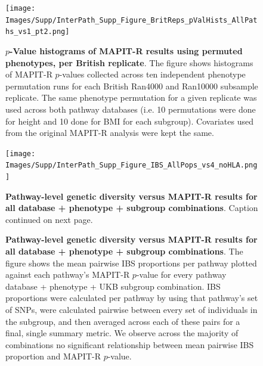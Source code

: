 \documentclass[12pt,a4paper]{article}
\begin{document}
\setlength{\footskip}{2cm}
\begin{figure}[htbp]
\centering
\vspace*{-1cm}
\texttt{[image: Images/Supp/InterPath\_Supp\_Figure\_BritReps\_pValHists\_AllPaths\_vs1\_pt2.png]}
\caption[TBD]{\textbf{$p$-Value histograms of MAPIT-R results using permuted phenotypes, per British replicate}. The figure shows histograms of MAPIT-R $p$-values collected across ten independent phenotype permutation runs for each British Ran4000 and Ran10000 subsample replicate. The same phenotype permutation for a given replicate was used across both pathway databases (i.e. 10 permutations were done for height and 10 done for BMI for each subgroup). Covariates used from the original MAPIT-R analysis were kept the same.}
\label{InterPath-Supp-Figure-BritReps-10perms-pValHists-pt2}
\end{figure}
\clearpage
\setlength{\footskip}{1cm}

\setlength{\footskip}{3cm}
\begin{figure}[htbp]
\centering
\vspace*{-2cm}
\texttt{[image: Images/Supp/InterPath\_Supp\_Figure\_IBS\_AllPops\_vs4\_noHLA.png]}
\caption[TBD]{\textbf{Pathway-level genetic diversity versus MAPIT-R results for all database + phenotype + subgroup combinations}. Caption continued on next page.}
\label{InterPath-Supp-Figure-IBS-AllPops}
\end{figure}
\clearpage
\setlength{\footskip}{1cm}
\addtocounter{figure}{-1}

\begin{figure} [t!]
\caption[TBD]{\textbf{Pathway-level genetic diversity versus MAPIT-R results for all database + phenotype + subgroup combinations}. The figure shows the mean pairwise IBS proportions per pathway plotted against each pathway's MAPIT-R $p$-value for every pathway database + phenotype + UKB subgroup combination. IBS proportions were calculated per pathway by using that pathway's set of SNPs, were calculated pairwise between every set of individuals in the subgroup, and then averaged across each of these pairs for a final, single summary metric. We observe across the majority of combinations no significant relationship between mean pairwise IBS proportion and MAPIT-R $p$-value.}
\label{InterPath-Supp-Figure-IBS-AllPops-Caption}
\end{figure}
\clearpage

\end{document}

